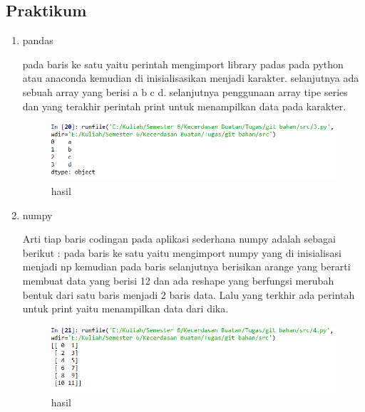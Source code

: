 \subsection{Praktikum}
\begin{enumerate}
\item pandas \par
pada baris ke satu yaitu perintah mengimport library padas pada python atau anaconda kemudian di inisialisasikan menjadi karakter. selanjutnya ada sebuah array yang berisi a b c d. selanjutnya penggunaan array tipe series dan yang terakhir perintah print untuk menampilkan data pada karakter.

\begin{figure}[ht]
\centering
\includegraphics[scale=0.5]{figures/1174031/3/3.PNG}
\caption{hasil}
\label{contoh}
\end{figure}

\item numpy\par
Arti tiap baris codingan pada aplikasi sederhana numpy adalah sebagai berikut : pada baris ke satu yaitu mengimport numpy yang di inisialisasi menjadi np kemudian pada baris selanjutnya berisikan arange yang berarti membuat data yang berisi 12 dan ada reshape yang berfungsi merubah bentuk dari satu baris menjadi 2 baris data. Lalu yang terkhir ada perintah untuk print yaitu menampilkan data dari dika.

\begin{figure}[ht]
\centering
\includegraphics[scale=0.5]{figures/1174031/3/4.PNG}
\caption{hasil}
\label{contoh}
\end{figure}


\end{enumerate}
